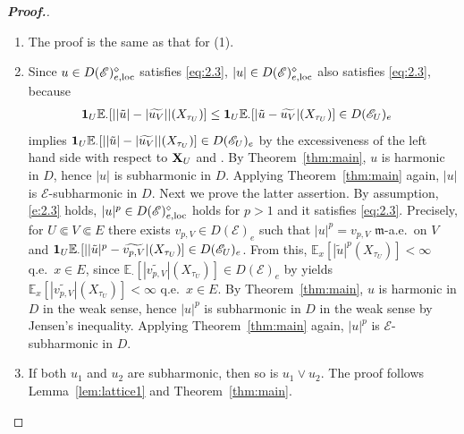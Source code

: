 \documentclass[12pt,a4paper]{article}
\newcommand{\m}{\mathfrak{m} }
\newcommand{\loc}{{\rm loc}}
\newcommand{\1}{{\bf 1}}
\newcommand{\wt}{\widetilde}
\renewcommand{\wt}{\widetilde}
\begin{document}
\begin{proof}[{\bf Proof.}]
\begin{enumerate}
The rest of the proof is similar as above. 
\item[\rm(2)] The proof is the same as that for (1). 
\item[\rm(3)] Since $u\in D(\mathscr{E})_{e,\loc}^{\diamond}$ satisfies \eqref{eq:2.3}, $|u|\in  D(\mathscr{E})_{e,\loc}^{\diamond}$ also satisfies \eqref{eq:2.3}, because 
\begin{align*}
\1_U\mathbb{E}_{\cdot}[||\tilde{u}|-|\wt{u_V}||(X_{\tau_U})]&\leq \1_U\mathbb{E}_{\cdot}[|\tilde{u}-\wt{u_V}|(X_{\tau_U})]\in D(\mathscr{E}_U)_e
\end{align*}
implies $\1_U\mathbb{E}_{\cdot}[||\tilde{u}|-|\wt{u_V}||(X_{\tau_U})]\in D(\mathscr{E}_U)_e$ by the excessiveness of the left hand side with respect to ${\bf X}_U$ and \cite[Lemma~3.3]{CK}.  
By Theorem~\ref{thm:main}, $u$ is harmonic in $D$, hence $|u|$ is subharmonic in $D$. Applying Theorem~\ref{thm:main} again, $|u|$ is $\mathscr{E}$-subharmonic in $D$. 
Next we prove the latter assertion. 
By assumption, 
\eqref{e:2.3} holds, 
$|u|^p\in D(\mathscr{E})_{e,\loc}^{\diamond}$ holds for $p>1$
and it satisfies \eqref{eq:2.3}. 
Precisely, for $U\Subset V\Subset E$ there exists $v_{p,V}\in D(\mathscr{E})_e$ such that 
$|u|^p=v_{p,V}$ ${\m}$-a.e.~on $V$ and 
$\1_U\mathbb{E}_{\cdot}[||\tilde{u}|^p-\wt{v_{p,V}}|(X_{\tau_U})]\in D(\mathscr{E}_U)_e$. 
From this, $\mathbb{E}_x[|\tilde{u}|^p(X_{\tau_U})]<\infty$ q.e.~$x\in E$, 
since $\mathbb{E}_{\cdot}[|\wt{v_{p,V}}|(X_{\tau_U})]\in D(\mathscr{E})_e$ 
by \cite[Theorem~4.6.5]{FOT} yields $\mathbb{E}_x[|\wt{v_{p,V}}|(X_{\tau_U})]<\infty$ q.e.~$x\in E$. 
By Theorem~\ref{thm:main}, $u$ is harmonic in $D$ in the weak sense, hence 
$|u|^p$ is subharmonic in $D$ in the weak sense by Jensen's inequality. 
Applying Theorem~\ref{thm:main} again, $|u|^p$ is 
$\mathscr{E}$-subharmonic in $D$.    
\item[\rm(4)]
If both $u_1$ and $u_2$ are subharmonic, then so is $u_1\lor u_2$. 
The proof follows Lemma~\ref{lem:lattice1} and  Theorem~\ref{thm:main}.
\end{enumerate}
\end{proof}
\end{document}

